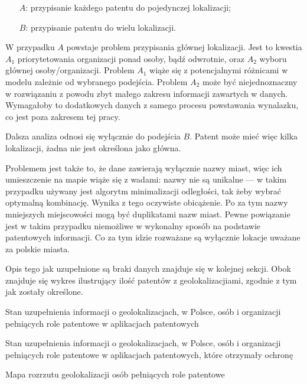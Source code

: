 \begin{enumerate}
\item[$A$:] przypisanie każdego patentu do pojedynczej lokalizacji;
\item[$B$:] przypisanie patentu do wielu lokalizacji.
\end{enumerate}

W przypadku $A$ powstaje problem przypisania głównej lokalizacji.
Jest to kwestia $A_1$ priorytetowania organizacji ponad osoby, bądź
odwrotnie, oraz $A_2$ wyboru głównej osoby/organizacji.
Problem $A_1$ wiąże się z potencjalnymi różnicami w modelu zależnie
od wybranego podejścia. Problem $A_2$ może być niejednoznaczny
w rozwiązaniu z powodu zbyt małego zakresu informacji zawartych w danych.
Wymagałoby to dodatkowych danych z samego procesu powstawania wynalazku,
co jest poza zakresem tej pracy.

Dalsza analiza odnosi się wyłącznie do podejścia $B$.
Patent może mieć więc kilka lokalizacji, żadna nie jest określona jako główna.

Problemem jest także to, że dane zawierają wyłącznie nazwy miast, 
więc ich umieszczenie na mapie wiąże się z wadami: 
nazwy nie są unikalne --- w takim przypadku używany jest algorytm minimalizacji 
odległości, tak żeby wybrać optymalną kombinację. 
Wynika z tego oczywiste obicążenie. 
Po za tym nazwy mniejszych miejscowości mogą być duplikatami
nazw miast. Pewne powiązanie jest w takim przypadku niemożliwe
w wykonalny sposób na podstawie patentowych informacji.
Co za tym idzie rozważane są wyłącznie lokacje uważane za polskie miasta.


\newpage

Opis tego jak uzupełnione są braki danych znajduje się w kolejnej sekcji.
Obok znajduje się wykres ilustrujący ilość patentów z geolokalizacjiami,
zgodnie z tym jak zostały określone.

{ Stan uzupełnienia informacji o geolokalizacjach, w Polsce, 
  osób i organizacji  pełniących role patentowe
  w aplikacjach patentowych}

{ Stan uzupełnienia informacji o geolokalizacjach, w Polsce, 
  osób i organizacji  pełniących role patentowe
  w aplikacjach patentowych, które otrzymały ochronę}

\newpage

{Mapa rozrzutu geolokalizacji osób pełniących role patentowe}







